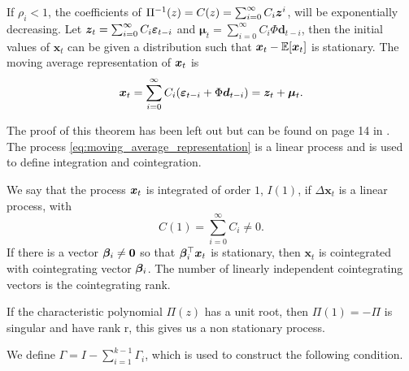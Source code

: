 \begin{thm}{\hfill}
    \noindent If $\rho_i<1$, the coefficients of $\Pi^{-1}(z)=C(z)=\sum_{i=0}^\infty C_i\boldsymbol{z}^i$, will be exponentially decreasing. Let $\boldsymbol{z}_t=\sum_{i=0}^\infty C_i\boldsymbol{\varepsilon}_{t-i}$ and $\boldsymbol{\mu}_t=\sum_{i=0}^\infty C_i\Phi \boldsymbol{d}_{t-i}$, then the initial values of $\boldsymbol{x}_t$ can be given a distribution such that $\boldsymbol{x}_t - \mathbb{E}[\boldsymbol{x}_t]$ is stationary. The moving average representation of $\boldsymbol{x}_t$ is 
    \begin{equation}
        \boldsymbol{x}_t=\sum_{i=0}^\infty C_i(\boldsymbol{\varepsilon}_{t-i}+\Phi \boldsymbol{d}_{t-i})=\boldsymbol{z}_t + \boldsymbol{\mu}_t.
        \label{eq:moving_average_representation}
    \end{equation}
\end{thm}
\noindent The proof of this theorem has been left out but can be found on page 14 in \cite{Likelihood-based-inference-book}.\\
\noindent The process \eqref{eq:moving_average_representation} is a linear process and is used to define integration and cointegration.
\begin{defi}{\hfill}
    We say that the process $\boldsymbol{x}_t$ is integrated of order $1$, $I(1)$, if $\Delta \boldsymbol{x}_t$ is a linear process, with 
    \begin{equation*}
        C(1) = \sum^\infty_{i=0} C_i \neq 0.
    \end{equation*}
    If there is a vector $\boldsymbol{\beta}_i \neq \boldsymbol{0}$ so that $\boldsymbol{\beta}_i^\top \boldsymbol{x}_t$ is stationary, then $\boldsymbol{x}_t$ is cointegrated with cointegrating vector $\boldsymbol{\beta}_i$. The number of linearly independent cointegrating vectors is the cointegrating rank.
\end{defi}

\noindent If the characteristic polynomial $\Pi(z)$ has a unit root, then $\Pi(1)=-\Pi$ is singular and have rank r, this gives us a non stationary process. 

\noindent
We define $\Gamma=I-\sum_{i=1}^{k-1}\Gamma_i$, which is used to construct the following condition.

